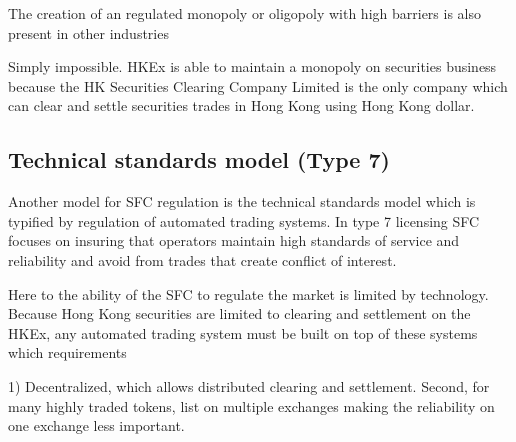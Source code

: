 The creation of an regulated monopoly or oligopoly with high barriers
is also present in other industries

Simply impossible.  HKEx is able to maintain a monopoly on securities
business because the HK Securities Clearing Company Limited is the
only company which can clear and settle securities trades in Hong Kong
using Hong Kong dollar.  


\subsection{Technical standards model (Type 7)}

Another model for SFC regulation is the technical standards model
which is typified by regulation of automated trading systems.  In type
7 licensing SFC focuses on insuring that operators maintain high
standards of service and reliability and avoid from trades that create
conflict of interest.

Here to the ability of the SFC to regulate the market is limited by
technology.  Because Hong Kong securities are limited to clearing and
settlement on the HKEx, any automated trading system must be built on
top of these systems which requirements

1) Decentralized, which allows distributed clearing and settlement.
Second, for many highly traded tokens, list on multiple exchanges
making the reliability on one exchange less important.

